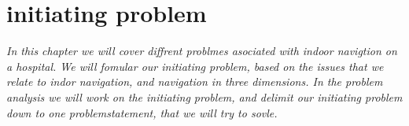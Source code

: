 \chapter{initiating problem}
\textit{In this chapter we will cover diffrent problmes asociated with indoor navigtion on a hospital. We will fomular our initiating problem, based on the issues that we relate to indor navigation, and navigation in three dimensions. In the problem analysis we will work on the initiating problem, and delimit our initiating problem down to one problemstatement, that we will try to sovle.
}